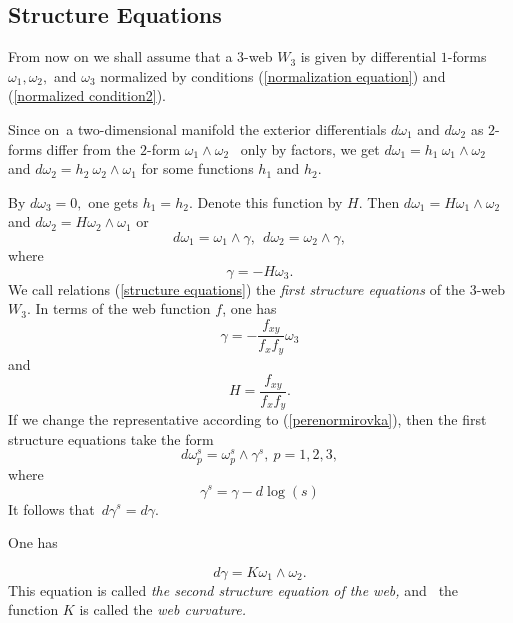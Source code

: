 \documentclass{article}
\begin{document}
\subsection{Structure Equations}

From now on we shall assume that a $3$-web $W_{3}$ is given by differential $%
1$-forms $\omega _{1},\omega _{2},$ and $\omega _{3}$ normalized by
conditions (\ref{normalization equation}) and (\ref{normalized condition2}).

Since on\ a two-dimensional manifold the exterior differentials $d\omega
_{1} $ and $d\omega _{2}$ as $2$-forms differ from the $2$-form $\omega
_{1}\wedge \omega _{2}$ \ only by factors, we get $d\omega _{1}=h_{1}\
\omega _{1}\wedge \omega _{2}$ and $d\omega _{2}=h_{2}\ \omega _{2}\wedge
\omega _{1}$ for some functions $h_{1}$ and $h_{2}.$

By $d\omega _{3}=0,$ one gets $h_{1}=h_{2}.$ Denote this function by $H.$
Then $d\omega _{1}=H\omega _{1}\wedge \omega _{2}\ \ $and $d\omega
_{2}=H\omega _{2}\wedge \omega _{1}$ or
\begin{equation}
d\omega _{1}=\omega _{1}\wedge \gamma ,\ \ d\omega _{2}=\omega _{2}\wedge
\gamma ,  \label{structure equations}
\end{equation}%
where
\begin{equation}
\gamma =-H\omega _{3}.  \label{Gamma}
\end{equation}%
We call relations (\ref{structure equations}) the \emph{first structure
equations} of the $3$-web $W_{3}.$ In terms of the web function $f$, one has
\begin{equation*}
\gamma =-\frac{f_{xy}}{f_{x}f_{y}}\omega _{3}
\end{equation*}%
and
\begin{equation*}
H=\frac{f_{xy}}{f_{x}f_{y}}.
\end{equation*}%
If we change the representative according to (\ref{perenormirovka}), then
the first structure equations take the form
\begin{equation*}
d\omega _{p}^{s}=\omega _{p}^{s}\wedge \gamma ^{s},\ p=1,2,3,
\end{equation*}%
where
\begin{equation*}
\gamma ^{s}=\gamma -d\log \left( s\right)
\end{equation*}%
It follows that\ $d\gamma ^{s}=d\gamma $.

One has

\begin{equation}
d\gamma =K\omega _{1}\wedge \omega _{2}.  \label{curvature function}
\end{equation}
This equation is called \emph{the second structure equation of the web, }and%
\emph{\ }the function $K$ is called the \emph{web curvature.}
\end{document}
